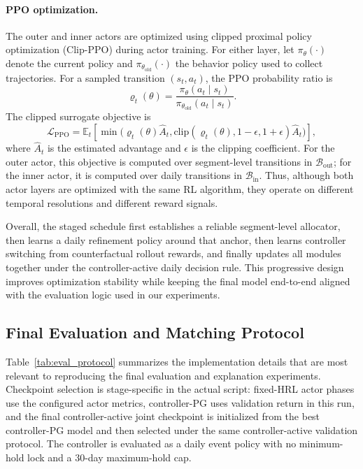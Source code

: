 \documentclass[letterpaper]{article} %
\begin{document}
\paragraph{PPO optimization.}
The outer and inner actors are optimized using clipped proximal policy optimization (Clip-PPO) during actor training. For either layer, let \(\pi_{\theta}(\cdot)\) denote the current policy and \(\pi_{\theta_{\mathrm{old}}}(\cdot)\) the behavior policy used to collect trajectories. For a sampled transition \((s_t,a_t)\), the PPO probability ratio is
\[
\varrho_t(\theta)
=
\frac{\pi_{\theta}(a_t\mid s_t)}
{\pi_{\theta_{\mathrm{old}}}(a_t\mid s_t)}.
\]
The clipped surrogate objective is
\[
\mathcal{L}_{\mathrm{PPO}}
=
\mathbb{E}_t\!\left[
\min\!\bigl(
\varrho_t(\theta)\hat{A}_t,
\mathrm{clip}(\varrho_t(\theta),1-\epsilon,1+\epsilon)\hat{A}_t
\bigr)
\right],
\]
where \(\hat{A}_t\) is the estimated advantage and \(\epsilon\) is the clipping coefficient. For the outer actor, this objective is computed over segment-level transitions in \(\mathcal{B}_{\mathrm{out}}\); for the inner actor, it is computed over daily transitions in \(\mathcal{B}_{\mathrm{in}}\). Thus, although both actor layers are optimized with the same RL algorithm, they operate on different temporal resolutions and different reward signals.

Overall, the staged schedule first establishes a reliable segment-level allocator, then learns a daily refinement policy around that anchor, then learns controller switching from counterfactual rollout rewards, and finally updates all modules together under the controller-active daily decision rule. This progressive design improves optimization stability while keeping the final model end-to-end aligned with the evaluation logic used in our experiments.

\subsection{Final Evaluation and Matching Protocol}
\label{app:eval_protocol}

Table~\ref{tab:eval_protocol} summarizes the implementation details that are most relevant to reproducing the final evaluation and explanation experiments. Checkpoint selection is stage-specific in the actual script: fixed-HRL actor phases use the configured actor metrics, controller-PG uses validation return in this run, and the final controller-active joint checkpoint is initialized from the best controller-PG model and then selected under the same controller-active validation protocol. The controller is evaluated as a daily event policy with no minimum-hold lock and a 30-day maximum-hold cap.
\end{document}
